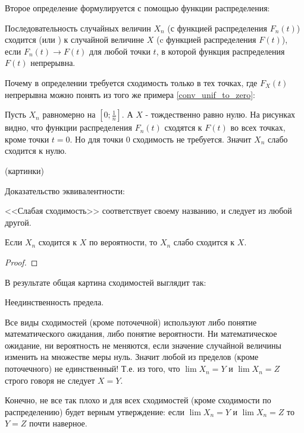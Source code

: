 {\begin{myex}

\end{myex}

Второе определение формулируется с помощью функции распределения:

\begin{mydef} Последовательность случайных величин $X_{n}$ (с функцией распределения $F_{n}(t)$) сходится  (или ) к случайной величине $X$ (c функцией распределения $F(t)$), если $F_{n}(t)\to F(t)$ для любой точки $t$, в которой функция распределения $F(t)$ непрерывна.
\end{mydef}

Почему в определении требуется сходимость только в тех точках, где $F_{X}(t)$ непрерывна можно понять из того же примера \ref{conv_unif_to_zero}:
\begin{myex}
\label{conv_unif_to_zero2}
Пусть $X_{n}$ равномерно на $[0;\frac{1}{n}]$. А $X$ - тождественно равно нулю. На рисунках видно, что функции распределения $F_{n}(t)$ сходятся к $F(t)$ во всех точках, кроме точки $t=0$. Но для точки $0$ сходимость не требуется. Значит $X_{n}$ слабо сходится к нулю.

(картинки)
\end{myex}


Доказательство эквивалентности:







<<Слабая сходимость>> соответствует своему названию, и следует из любой другой.

\begin{myth} Если $X_{n}$ сходится к $X$ по вероятности, то $X_{n}$ слабо сходится к $X$.
\end{myth}
\begin{proof}
\end{proof}
В результате общая картина сходимостей выглядит так:




Неединственность предела. \par
Все виды сходимостей (кроме поточечной) используют либо понятие математического ожидания, либо понятие вероятности. Ни математическое ожидание, ни вероятность не меняются, если значение случайной величины изменить на множестве меры нуль. Значит любой из пределов (кроме поточечного) не единственный! Т.е. из того, что $\lim X_{n}=Y$ и $\lim X_{n}=Z$ строго говоря не следует $X=Y$. \par
Конечно, не все так плохо и для всех сходимостей (кроме сходимости по распределению) будет верным утверждение: если $\lim X_{n}=Y$ и $\lim X_{n}=Z$ то $Y=Z$ почти наверное. \par

}
